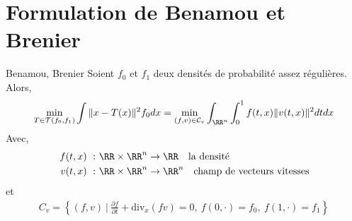 \documentclass{beamer}
\begin{document}
  
  
  \section{Formulation de Benamou et Brenier}
  \begin{frame}
  \begin{theoreme}{Benamou, Brenier}
	Soient $f_0$ et $f_1$ deux densités de probabilité assez régulières. Alors, 
	\begin{align*}
	\min_{T\in\mathcal{T}(f_0,f_1)} \int\|x-T(x)\|^2f_0dx =\min_{(f,v)\in\mathcal{C}_v}\int_{\RR^n}\int_0^1 f(t,x)\|v(t,x)\|^2dtdx
	\end{align*}
	Avec,
	\begin{align*}
	f(t,x)\ :&\ \RR\times\RR^n\rightarrow \RR \quad \text{la densité}\\
	v(t,x)\ :&\ \RR\times\RR^n\rightarrow \RR^n \quad \text{champ de vecteurs vitesses}
	\end{align*}
	et 
	\begin{align*}
	C_v=\left\{(f,v)\ |\ \frac{\partial f}{\partial t} + \text{div}_x (fv) =0,\ f(0,\cdot) = f_0,\ f(1,\cdot)=f_1 \right\}
	\end{align*}
	\end{theoreme}
  \end{frame}
  
\end{document}
